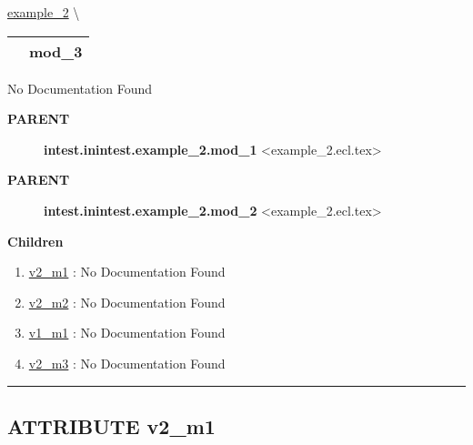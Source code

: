 \hypertarget{ecldoc:intest.inintest.example_2.mod_3}{}
\hspace{0pt} \hyperlink{ecldoc:intest.inintest.example_2}{example_2} \textbackslash 

{\renewcommand{\arraystretch}{1.5}
\begin{tabularx}{\textwidth}{|>{\raggedright\arraybackslash}l|X|}
\hline
\hspace{0pt}\mytexttt{\color{red} } & \textbf{mod\_3} \\
\hline
\end{tabularx}
}

\par





No Documentation Found










\par
\begin{description}
\item [\colorbox{tagtype}{\color{white} \textbf{\textsf{PARENT}}}] \textbf{intest.inintest.example\_2.mod\_1} <example\_2.ecl.tex>
\item [\colorbox{tagtype}{\color{white} \textbf{\textsf{PARENT}}}] \textbf{intest.inintest.example\_2.mod\_2} <example\_2.ecl.tex>
\end{description}


\textbf{Children}
\begin{enumerate}
\item \hyperlink{ecldoc:intest.inintest.example_2.mod_1.v2_m1}{v2\_m1}
: No Documentation Found
\item \hyperlink{ecldoc:intest.inintest.example_2.mod_2.v2_m2}{v2\_m2}
: No Documentation Found
\item \hyperlink{ecldoc:intest.inintest.example_2.mod_3.v1_m1}{v1\_m1}
: No Documentation Found
\item \hyperlink{ecldoc:intest.inintest.example_2.mod_3.v2_m3}{v2\_m3}
: No Documentation Found
\end{enumerate}

\rule{\linewidth}{0.5pt}

\subsection*{\textsf{\colorbox{headtoc}{\color{white} ATTRIBUTE}
v2\_m1}}

